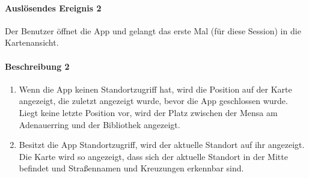 \paragraph{Auslösendes Ereignis 2}
Der Benutzer öffnet die App und gelangt das erste Mal (für diese Session) in die Kartenansicht.
\paragraph{Beschreibung 2}
\begin{enumerate}
    \item Wenn die App keinen Standortzugriff hat, wird die Position auf der Karte angezeigt, die zuletzt angezeigt wurde, bevor die App geschlossen wurde. Liegt keine letzte Position vor, wird der Platz zwischen der Mensa am Adenauerring und der Bibliothek angezeigt.
    \item Besitzt die App Standortzugriff, wird der aktuelle Standort auf ihr angezeigt. Die Karte wird so angezeigt, dass sich der aktuelle Standort in der Mitte befindet und Straßennamen und Kreuzungen erkennbar sind.
\end{enumerate}